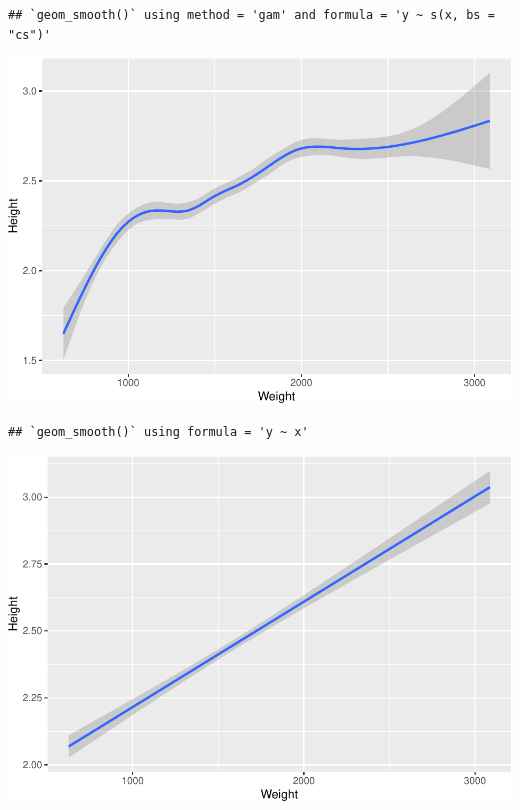 \documentclass[
]{book}
\begin{document}
\begin{verbatim}
## `geom_smooth()` using method = 'gam' and formula = 'y ~ s(x, bs = "cs")'
\end{verbatim}

\includegraphics{Data-Visualisation-geom-Encyclopedia_files/figure-latex/unnamed-chunk-47-1.pdf}

\begin{verbatim}
## `geom_smooth()` using formula = 'y ~ x'
\end{verbatim}

\includegraphics{Data-Visualisation-geom-Encyclopedia_files/figure-latex/unnamed-chunk-48-1.pdf}
\end{document}
